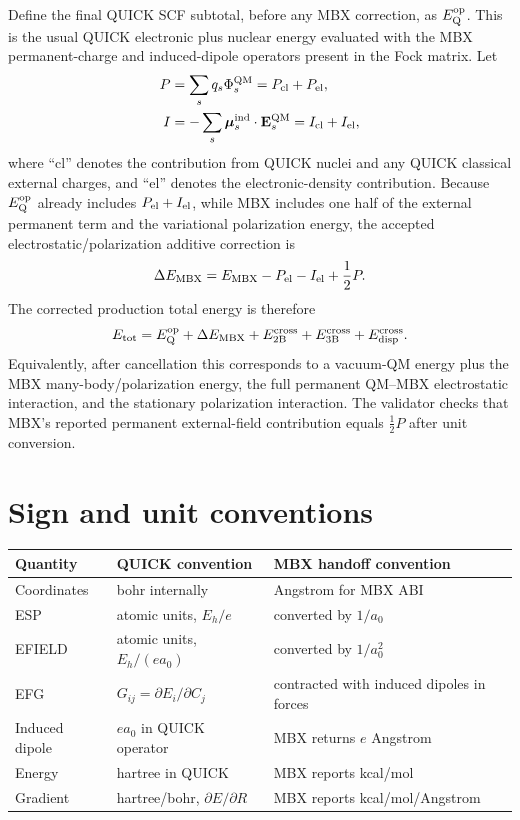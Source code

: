 \documentclass[11pt]{article}
\begin{document}
Define the final QUICK SCF subtotal, before any MBX correction, as
$E_{\rm Q}^{\rm op}$. This is the usual QUICK electronic plus nuclear
energy evaluated with the MBX permanent-charge and induced-dipole
operators present in the Fock matrix. Let
\begin{align}
  P &= \sum_s q_s \Phi^{\rm QM}_s = P_{\rm cl}+P_{\rm el},\\
  I &= -\sum_s \boldsymbol{\mu}^{\rm ind}_s\cdot
       \mathbf{E}^{\rm QM}_s = I_{\rm cl}+I_{\rm el},
\end{align}
where ``cl'' denotes the contribution from QUICK nuclei and any QUICK
classical external charges, and ``el'' denotes the electronic-density
contribution. Because $E_{\rm Q}^{\rm op}$ already includes
$P_{\rm el}+I_{\rm el}$, while MBX includes one half of the external
permanent term and the variational polarization energy, the accepted
electrostatic/polarization additive correction is
\begin{equation}
  \Delta E_{\rm MBX}
  =
  E_{\rm MBX}
  - P_{\rm el}
  - I_{\rm el}
  + \frac{1}{2}P .
  \label{eq:quick_mbx_additive}
\end{equation}
The corrected production total energy is therefore
\begin{equation}
  E_{\rm tot}=E_{\rm Q}^{\rm op}+\Delta E_{\rm MBX}
  +E_{2\rm B}^{\rm cross}+E_{3\rm B}^{\rm cross}
  +E_{\rm disp}^{\rm cross}.
  \label{eq:quick_mbx_total}
\end{equation}
Equivalently, after cancellation this corresponds to a vacuum-QM energy
plus the MBX many-body/polarization energy, the full permanent
QM--MBX electrostatic interaction, and the stationary polarization
interaction. The validator checks that MBX's reported permanent
external-field contribution equals $\frac{1}{2}P$ after unit conversion.

\section{Sign and unit conventions}

\begin{tabular}{lll}
\toprule
Quantity & QUICK convention & MBX handoff convention \\
\midrule
Coordinates & bohr internally & Angstrom for MBX ABI \\
ESP & atomic units, $E_h/e$ & converted by $1/a_0$ \\
EFIELD & atomic units, $E_h/(e a_0)$ & converted by $1/a_0^2$ \\
EFG & $G_{ij}=\partial E_i/\partial C_j$ & contracted with induced dipoles in forces \\
Induced dipole & $e a_0$ in QUICK operator & MBX returns $e$ Angstrom \\
Energy & hartree in QUICK & MBX reports kcal/mol \\
Gradient & hartree/bohr, $\partial E/\partial R$ & MBX reports kcal/mol/Angstrom \\
\bottomrule
\end{tabular}
\end{document}
